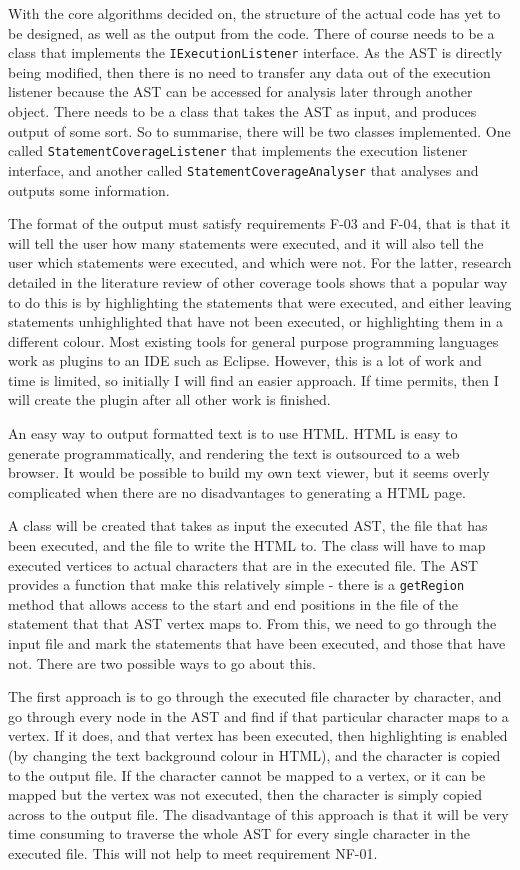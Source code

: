 With the core algorithms decided on, the structure of the actual code has yet to be designed, as well as the output from the code. There of course needs to be a class that implements the \verb|IExecutionListener| interface. As the AST is directly being modified, then there is no need to transfer any data out of the execution listener because the AST can be accessed for analysis later through another object. There needs to be a class that takes the AST as input, and produces output of some sort. So to summarise, there will be two classes implemented. One called \verb|StatementCoverageListener| that implements the execution listener interface, and another called \verb|StatementCoverageAnalyser| that analyses and outputs some information.

The format of the output must satisfy requirements F-03 and F-04, that is that it will tell the user how many statements were executed, and it will also tell the user which statements were executed, and which were not. For the latter, research detailed in the literature review of other coverage tools shows that a popular way to do this is by highlighting the statements that were executed, and either leaving statements unhighlighted that have not been executed, or highlighting them in a different colour. Most existing tools for general purpose programming languages work as plugins to an IDE such as Eclipse. However, this is a lot of work and time is limited, so initially I will find an easier approach. If time permits, then I will create the plugin after all other work is finished.

An easy way to output formatted text is to use HTML. HTML is easy to generate programmatically, and rendering the text is outsourced to a web browser. It would be possible to build my own text viewer, but it seems overly complicated when there are no disadvantages to generating a HTML page.

A class will be created that takes as input the executed AST, the file that has been executed, and the file to write the HTML to. The class will have to map executed vertices to actual characters that are in the executed file. The AST provides a function that make this relatively simple - there is a \verb|getRegion| method that allows access to the start and end positions in the file of the statement that that AST vertex maps to. From this, we need to go through the input file and mark the statements that have been executed, and those that have not. There are two possible ways to go about this. 

The first approach is to go through the executed file character by character, and go through every node in the AST and find if that particular character maps to a vertex. If it does, and that vertex has been executed, then highlighting is enabled (by changing the text background colour in HTML), and the character is copied to the output file. If the character cannot be mapped to a vertex, or it can be mapped but the vertex was not executed, then the character is simply copied across to the output file. The disadvantage of this approach is that it will be very time consuming to traverse the whole AST for every single character in the executed file. This will not help to meet requirement NF-01.

